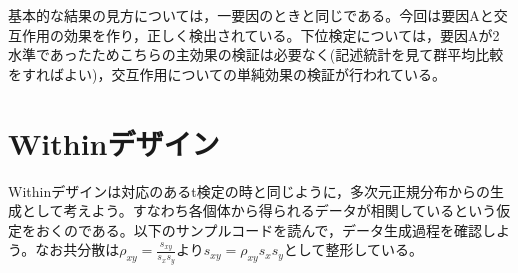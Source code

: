 \documentclass[
  a4paper,
]{ltjsbook}
\begin{document}
基本的な結果の見方については，一要因のときと同じである。今回は要因Aと交互作用の効果を作り，正しく検出されている。下位検定については，要因Aが2水準であったためこちらの主効果の検証は必要なく(記述統計を見て群平均比較をすればよい)，交互作用についての単純効果の検証が行われている。

\section{Withinデザイン}\label{withinux30c7ux30b6ux30a4ux30f3}

Withinデザインは対応のあるt検定の時と同じように，多次元正規分布からの生成として考えよう。すなわち各個体から得られるデータが相関しているという仮定をおくのである。以下のサンプルコードを読んで，データ生成過程を確認しよう。なお共分散は\(\rho_{xy}=\frac{s_{xy}}{s_xs_y}\)より\(s_{xy}=\rho_{xy}s_xs_y\)として整形している。
\end{document}
